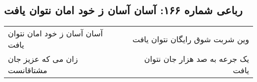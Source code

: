 \begin{center}
\section*{رباعی شماره ۱۶۶: آسان آسان ز خود امان نتوان یافت}
\label{sec:sh166}
\begin{longtable}{l p{0.5cm} r}
آسان آسان ز خود امان نتوان یافت
&&
وین شربت شوق رایگان نتوان یافت
\\
زان می که عزیز جان مشتاقانست
&&
یک جرعه به صد هزار جان نتوان یافت
\\
\end{longtable}
\end{center}
